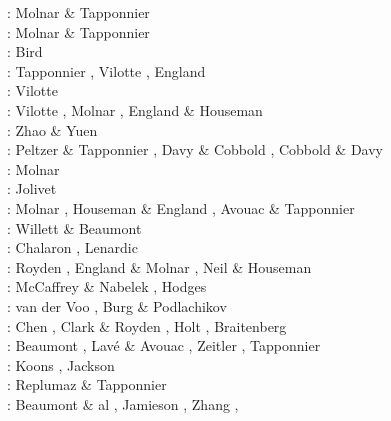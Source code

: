 \begin{itemize}
\begin{scriptsize}
\nineteenseventyfive: Molnar \& Tapponnier \cite{mota75}\\
\nineteenseventyseven:  Molnar \& Tapponnier \cite{mota77}\\
\nineteenseventyeight: Bird \cite{bird78}\\
\nineteeneightytwo: Tapponnier \etal \cite{tapl82}, Vilotte \etal \cite{vidm82}, England \cite{engl82}\\
\nineteeneightyfour: Vilotte \etal \cite{vidm84}\\
\nineteeneightysix: Vilotte \etal \cite{vimd86}, Molnar \cite{moln86}, England \& Houseman \cite{enho86}\\
\nineteeneightyseven: Zhao \& Yuen \cite{zhyu87b} \\
\nineteeneightyeight: Peltzer \& Tapponnier \cite{peta88}, Davy \& Cobbold \cite{daco88}, 
                      Cobbold \& Davy \cite{coda88}\\
\nineteeneightynine: Molnar \cite{moln89}\\
\nineteenninety: Jolivet \etal \cite{jodc90}\\
\nineteenninetythree: Molnar \etal \cite{moem93}, Houseman \& England \cite{hoen93}, 
                      Avouac \& Tapponnier \cite{avta93}\\
\nineteenninetyfour: Willett \& Beaumont \cite{wibe94}\\
\nineteenninetyfive: Chalaron \etal \cite{chmm95}, Lenardic \etal \cite{leka95}\\
\nineteenninetyseven: Royden \etal \cite{robk97}, England \& Molnar \cite{enmo97}, 
                      Neil \& Houseman \cite{neho97}\\
\nineteenninetyeight: McCaffrey \& Nabelek \cite{mcna98}, Hodges \cite{hodg98}\\
\nineteenninetynine: van der Voo \etal \cite{vasb99}, Burg \& Podlachikov \cite{bupo99}\\
\twothousand: Chen \etal \cite{chbl00}, Clark \& Royden \cite{clro00}, Holt \cite{holt00},
              Braitenberg \etal \cite{brzf00}\\
\twothousandone: Beaumont \etal \cite{bejn01}, Lav{\'e} \& Avouac \cite{laav01}, Zeitler \etal \cite{zemk01}, 
                 Tapponnier \etal \cite{tazr01}\\
\twothousandtwo: Koons \etal \cite{kozc02}, Jackson \cite{jack02}\\
\twothousandthree: Replumaz \& Tapponnier \cite{reta03}\\
\twothousandfour: Beaumont \& al \cite{bejn04}, Jamieson \etal \cite{jabm04}, Zhang \etal \cite{zhsw04},

\end{scriptsize}
\end{itemize}
